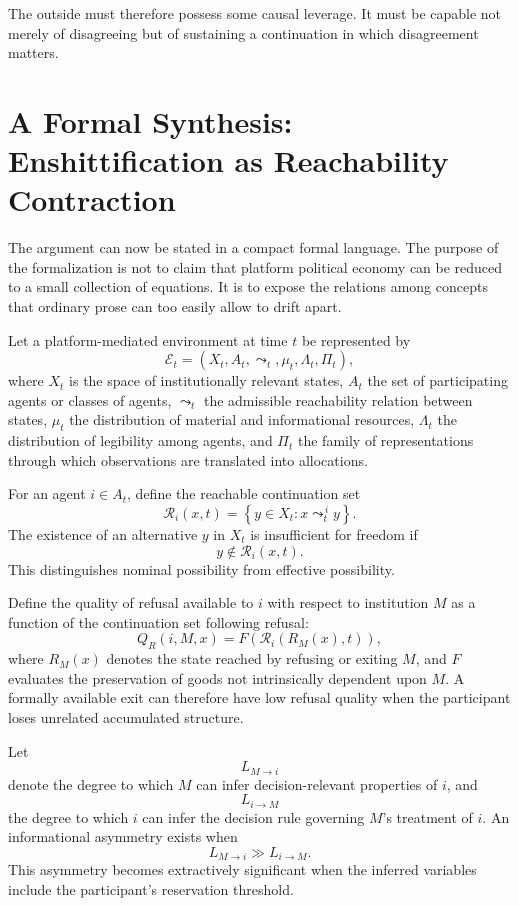 \documentclass[11pt]{article}
\begin{document}
The outside must therefore possess some causal leverage. It must be capable not merely of disagreeing but of sustaining a continuation in which disagreement matters.

\section{A Formal Synthesis: Enshittification as Reachability Contraction}

The argument can now be stated in a compact formal language. The purpose of the formalization is not to claim that platform political economy can be reduced to a small collection of equations. It is to expose the relations among concepts that ordinary prose can too easily allow to drift apart.

Let a platform-mediated environment at time \(t\) be represented by
\[
\mathcal{E}_t
=
\left(
X_t,
A_t,
\leadsto_t,
\mu_t,
\Lambda_t,
\Pi_t
\right),
\]
where \(X_t\) is the space of institutionally relevant states, \(A_t\) the set of participating agents or classes of agents, \(\leadsto_t\) the admissible reachability relation between states, \(\mu_t\) the distribution of material and informational resources, \(\Lambda_t\) the distribution of legibility among agents, and \(\Pi_t\) the family of representations through which observations are translated into allocations.

For an agent \(i\in A_t\), define the reachable continuation set
\[
\mathcal{R}_i(x,t)
=
\left\{
y\in X_t:
x\leadsto_t^{\,i}y
\right\}.
\]
The existence of an alternative \(y\) in \(X_t\) is insufficient for freedom if
\[
y\notin\mathcal{R}_i(x,t).
\]
This distinguishes nominal possibility from effective possibility.

Define the quality of refusal available to \(i\) with respect to institution \(M\) as a function of the continuation set following refusal:
\[
Q_R(i,M,x)
=
F\!\left(
\mathcal{R}_i(R_M(x),t)
\right),
\]
where \(R_M(x)\) denotes the state reached by refusing or exiting \(M\), and \(F\) evaluates the preservation of goods not intrinsically dependent upon \(M\). A formally available exit can therefore have low refusal quality when the participant loses unrelated accumulated structure.

Let
\[
L_{M\rightarrow i}
\]
denote the degree to which \(M\) can infer decision-relevant properties of \(i\), and
\[
L_{i\rightarrow M}
\]
the degree to which \(i\) can infer the decision rule governing \(M\)'s treatment of \(i\). An informational asymmetry exists when
\[
L_{M\rightarrow i}
\gg
L_{i\rightarrow M}.
\]
This asymmetry becomes extractively significant when the inferred variables include the participant's reservation threshold.
\end{document}
